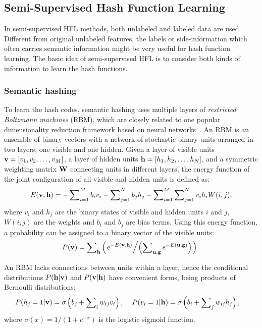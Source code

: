 \subsection{Semi-Supervised Hash Function Learning}
In semi-supervised \mbox{HFL} methods, both unlabeled and labeled data are used. Different from original unlabeled features, the labels or side-information which often carries semantic information might be very useful for hash function learning. The basic idea of semi-supervised \mbox{HFL} is to consider both kinds of information to learn the hash functions.

\subsubsection{Semantic hashing}
To learn the hash codes, semantic hashing uses multiple layers of \textit{restricted Boltzmann machines} (\mbox{RBM}), which are closely related to one popular dimensionality reduction framework based on neural networks~\cite{hinton2006science}. An \mbox{RBM} is an ensemble of binary vectors with a network of stochastic binary units arranged in two layers, one visible and one hidden. Given a layer of visible units ${\bf v} = [v_1, v_2, \dots, v_M]$, a layer of hidden units ${\bf h}=[h_1, h_2,\dots, h_N]$, and a symmetric weighting matrix ${\bf W}$ connecting units in different layers, the energy function of the joint configuration of all visible and hidden units is defined as:
\begin{align}
E({\bf v}, {\bf h}) = -\sum\nolimits_{i=1}\nolimits^{M}b_{i}v_{i}-\sum\nolimits_{j=1}\nolimits^{N}b_{j}h_{j}-\sum\nolimits_{i=1}\nolimits^{M}\sum\nolimits_{j=1}\nolimits^{N}v_i h_i W(i,j),
\end{align}
where $v_i$ and $h_j$ are the binary states of visible and hidden units $i$ and $j$, $ W(i,j)$ are the weights and $b_i$ and $b_j$ are bias terms. Using this energy function, a probability can be assigned to a binary vector of the visible
units:
\begin{align}
P({\bf v}) =\sum\nolimits_{{\bf h}}\left(\left.e^{-E({\bf v},{\bf h})}\middle/\left(\sum\nolimits_{{\bf u},{\bf g}}e^{-E({\bf u},{\bf g})}\right)\right.\right).\nonumber
\end{align}

An \mbox{RBM} lacks connections between units within a layer, hence the conditional distributions $P({\bf h}|{\bf v})$ and $P({\bf v}|{\bf h})$ have convenient forms, being products of Bernoulli distributions:
\begin{align}
P(h_j = 1|\v) = \sigma\left(b_j +\sum\nolimits_{i}w_{ij}v_i\right), \ \ & \ \ P(v_i = 1|\h) = \sigma\left(b_i +\sum\nolimits_{j}w_{ij}h_j\right),\nonumber
\end{align}
where $\sigma(x) = 1/(1 + e^{-x})$ is the logistic sigmoid function.

